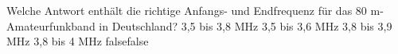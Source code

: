     {Welche Antwort enthält die richtige Anfangs- und Endfrequenz für das 80 m-Amateurfunkband in Deutschland?}
    {3,5 bis 3,8 MHz}
    {3,5 bis 3,6 MHz}
    {3,8 bis 3,9 MHz}
    {3,8 bis 4 MHz}
    {false}{false}